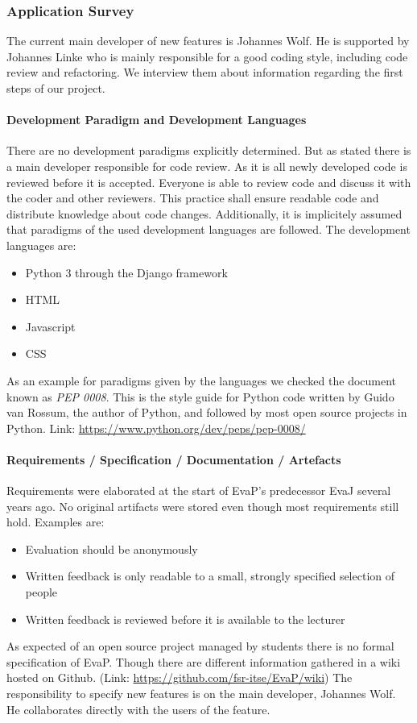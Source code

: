 \subsubsection{Application Survey}
The current main developer of new features is Johannes Wolf. 
He is supported by Johannes Linke who is mainly responsible for a good coding style, including code review and refactoring. 
We interview them about information regarding the first steps of our project.

\paragraph{Development Paradigm and Development Languages}
There are no development paradigms explicitly determined.
But as stated there is a main developer responsible for code review.
As it is all newly developed code is reviewed before it is accepted.
Everyone is able to review code and discuss it with the coder and other reviewers.
This practice shall ensure readable code and distribute knowledge about code changes.
Additionally, it is implicitely assumed that paradigms of the used development languages are followed.
The development languages are:
\begin{itemize}
    \item Python 3 through the Django framework
    \item HTML
    \item Javascript
    \item CSS
\end{itemize}
As an example for paradigms given by the languages we checked the document known as \emph{PEP 0008}.
This is the style guide for Python code written by Guido van Rossum, the author of Python, and followed by most open source projects in Python.
Link: \url{https://www.python.org/dev/peps/pep-0008/}

\paragraph{Requirements / Specification / Documentation / Artefacts}
Requirements were elaborated at the start of EvaP's predecessor EvaJ several years ago.
No original artifacts were stored even though most requirements still hold. 
Examples are:
\begin{itemize}
    \item Evaluation should be anonymously
    \item Written feedback is only readable to a small, strongly specified selection of people
    \item Written feedback is reviewed before it is available to the lecturer
\end{itemize}
As expected of an open source project managed by students there is no formal specification of EvaP. 
Though there are different information gathered in a wiki hosted on Github. (Link: \url{https://github.com/fsr-itse/EvaP/wiki})
The responsibility to specify new features is on the main developer, Johannes Wolf.
He collaborates directly with the users of the feature. 


